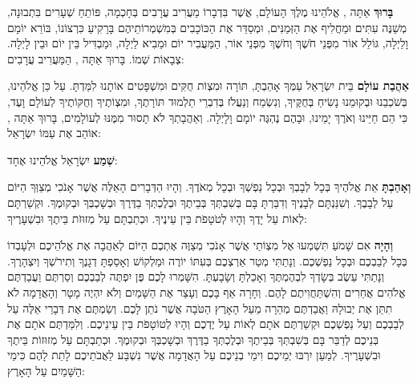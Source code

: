 

\textbf{בָּרוּךְ} אַתָּה \Shem{}, אֱלֹהֵינוּ מֶלֶךְ הָעוֹלָם, אֲשֶׁר בִּדְבָרוֹ מַעֲרִיב עֲרָבִים בְּחָכְמָה, פּוֹתֵחַ שְׁעָרִים בִּתְבוּנָה, מְשַׁנֶּה עִתִּים וּמַחֲלִיף אֶת הַזְּמַנִּים, וּמְסַדֵּר אֶת הַכּוֹכָבִים בְּמִשְׁמְרוֹתֵיהֶם בָּרָקִיעַ כִּרְצוֹנוֹ, בּוֹרֵא יוֹמָם וָלַיְלָה, גּוֹלֵל אוֹר מִפְּנֵי חֹשֶׁךְ וְחֹשֶׁךְ מִפְּנֵי אוֹר, הַמַּעֲבִיר יוֹם וּמֵבִיא לַיְלָה, וּמַבְדִּיל בֵּין יוֹם וּבֵין לָיְלָה. \Shem{} צְבָאוֹת שְׁמוֹ. בָּרוּךְ אַתָּה \Shem{}, הַמַּעֲרִיב עֲרָבִים:

\textbf{אַהֲבַת עוֹלָם} בֵּית יִשְׂרָאֵל עַמְּךָ אָהַבְתָּ, תּוֹרָה וּמִצְוֹת חֻקִּים וּמִשְׁפָּטִים אוֹתָנוּ לִמַּדְתָּ. עַל כֵּן \Shem{} אֱלֹהֵינוּ, בְּשֹׁכְבֵנוּ וּבְקוּמֵנוּ נָשִׂיחַ בְּחֻקֶּיךָ, וְנִשְׂמַח וְנַעֲלֹז בְּדִבְרֵי תַלְמוּד תּוֹרָתֶךָ, וּמִצְוֹתֶיךָ וְחֻקּוֹתֶיךָ לְעוֹלָם וָעֶד, כִּי הֵם חַיֵּינוּ וְאֹרֶךְ יָמֵינוּ, וּבָהֶם נֶהְגֶּה יוֹמָם וָלָיְלָה. וְאַהֲבָתְךָ לֹא תָסוּר מִמֶּנּוּ לְעוֹלָמִים, בָּרוּךְ אַתָּה \Shem{}, אוֹהֵב אֶת עַמּוֹ יִשְׂרָאֵל:

\textbf{שְׁמַע} יִשְׂרָאֵל \Shem{} אֱלֹהֵינוּ \Shem{} אֶחָד:


\textbf{וְאָהַבְתָּ} אֵת \Shem{} אֱלֹהֶיךָ בְּכָל לְבָבְךָ וּבְכָל נַפְשְׁךָ וּבְכָל מְאֹדֶךָ. וְהָיוּ הַדְּבָרִים הָאֵלֶּה אֲשֶׁר אָנֹכִי מְצַוְּךָ הַיּוֹם עַל לְבָבֶךָ. וְשִׁנַּנְתָּם לְבָנֶיךָ וְדִבַּרְתָּ בָּם בְּשִׁבְתְּךָ בְּבֵיתֶךָ וּבְלֶכְתְּךָ בַדֶּרֶךְ וּבְשָׁכְבְּךָ וּבְקוּמֶךָ. וּקְשַׁרְתָּם לְאוֹת עַל יָדֶךָ וְהָיוּ לְטֹטָפֹת בֵּין עֵינֶיךָ. וּכְתַבְתָּם עַל מְזוּזֹת בֵּיתֶךָ וּבִשְׁעָרֶיךָ:

\textbf{וְהָיָה} אִם שָׁמֹעַ תִּשְׁמְעוּ אֶל מִצְוֹתַי אֲשֶׁר אָנֹכִי מְצַוֶּה אֶתְכֶם הַיּוֹם לְאַהֲבָה אֶת \Shem{} אֱלֹהֵיכֶם וּלְעָבְדוֹ בְּכָל לְבַבְכֶם וּבְכָל נַפְשְׁכֶם. וְנָתַתִּי מְטַר אַרְצְכֶם בְּעִתּוֹ יוֹרֶה וּמַלְקוֹשׁ וְאָסַפְתָּ דְגָנֶךָ וְתִירֹשְׁךָ וְיִצְהָרֶךָ. וְנָתַתִּי עֵשֶׂב בְּשָׂדְךָ לִבְהֶמְתֶּךָ וְאָכַלְתָּ וְשָׂבָעְתָּ. הִשָּׁמְרוּ לָכֶם פֶּן יִפְתֶּה לְבַבְכֶם וְסַרְתֶּם וַעֲבַדְתֶּם אֱלֹהִים אֲחֵרִים וְהִשְׁתַּחֲוִיתֶם לָהֶם. וְחָרָה אַף \Shem{} בָּכֶם וְעָצַר אֶת הַשָּׁמַיִם וְלֹא יִהְיֶה מָטָר וְהָאֲדָמָה לֹא תִתֵּן אֶת יְבוּלָהּ וַאֲבַדְתֶּם מְהֵרָה מֵעַל הָאָרֶץ הַטֹּבָה אֲשֶׁר \Shem{} נֹתֵן לָכֶם. וְשַׂמְתֶּם אֶת דְּבָרַי אֵלֶּה עַל לְבַבְכֶם וְעַל נַפְשְׁכֶם וּקְשַׁרְתֶּם אֹתָם לְאוֹת עַל יֶדְכֶם וְהָיוּ לְטוֹטָפֹת בֵּין עֵינֵיכֶם. וְלִמַּדְתֶּם אֹתָם אֶת בְּנֵיכֶם לְדַבֵּר בָּם בְּשִׁבְתְּךָ בְּבֵיתֶךָ וּבְלֶכְתְּךָ בַדֶּרֶךְ וּבְשָׁכְבְּךָ וּבְקוּמֶךָ. וּכְתַבְתָּם עַל מְזוּזוֹת בֵּיתֶךָ וּבִשְׁעָרֶיךָ. לְמַעַן יִרְבּוּ יְמֵיכֶם וִימֵי בְנֵיכֶם עַל הָאֲדָמָה אֲשֶׁר נִשְׁבַּע \Shem{} לַאֲבֹתֵיכֶם לָתֵת לָהֶם כִּימֵי הַשָּׁמַיִם עַל הָאָרֶץ:

